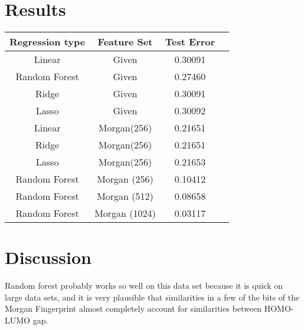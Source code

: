 \documentclass[11pt]{article}
\begin{document}
\section{Results}

\begin{center}
\begin{tabular}{|c|c|c|c|}
\hline
Regression type & Feature Set & Test Error\\
\hline
Linear &Given & 0.30091\\
Random Forest & Given& 0.27460\\
Ridge & Given& 0.30091\\
Lasso &Given& 0.30092\\
Linear&Morgan(256)& 0.21651\\
Ridge&Morgan(256)& 0.21651\\
Lasso&Morgan(256)& 0.21653 \\
Random Forest&Morgan (256)& 0.10412\\
Random Forest&Morgan (512)& 0.08658\\
Random Forest&Morgan (1024)& 0.03117\\
\hline
\end{tabular}
\end{center}

\section{Discussion}
Random forest probably works so well on this data set because it is quick on large data sets, and it is very plausible that similarities in a few of the bits of the Morgan Fingerprint almost completely account for similarities between HOMO-LUMO gap.
\end{document}
